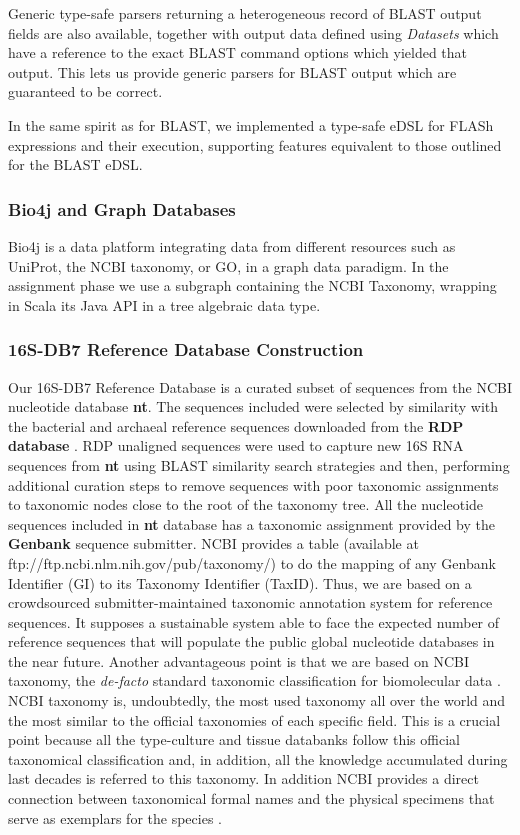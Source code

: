 \documentclass[fleqn,10pt,lineno]{wlpeerj}
\begin{document}
Generic type-safe parsers returning a heterogeneous record of BLAST
output fields are also available, together with output data defined
using \emph{Datasets} which have a reference to the exact BLAST command
options which yielded that output. This lets us provide generic parsers
for BLAST output which are guaranteed to be correct.

In the same spirit as for BLAST, we implemented a type-safe eDSL for
FLASh expressions and their execution, supporting features equivalent to
those outlined for the BLAST eDSL.

\subsubsection{Bio4j and Graph
Databases}\label{bio4j-and-graph-databases}

Bio4j \citep{pareja2015bio4j} is a data platform integrating data from
different resources such as UniProt, the NCBI taxonomy, or GO, in a
graph data paradigm. In the assignment phase we use a subgraph
containing the NCBI Taxonomy, wrapping in Scala its Java API in a tree
algebraic data type.

\subsubsection{16S-DB7 Reference Database
Construction}\label{s-db7-reference-database-construction}

Our 16S-DB7 Reference Database is a curated subset of sequences from the
NCBI nucleotide database \textbf{nt}. The sequences included were
selected by similarity with the bacterial and archaeal reference
sequences downloaded from the \textbf{RDP database}
\citep{cole2013ribosomal}. RDP unaligned sequences were used to capture
new 16S RNA sequences from \textbf{nt} using BLAST similarity search
strategies and then, performing additional curation steps to remove
sequences with poor taxonomic assignments to taxonomic nodes close to
the root of the taxonomy tree. All the nucleotide sequences included in
\textbf{nt} database has a taxonomic assignment provided by the
\textbf{Genbank} sequence submitter. NCBI provides a table (available at
ftp://ftp.ncbi.nlm.nih.gov/pub/taxonomy/) to do the mapping of any
Genbank Identifier (GI) to its Taxonomy Identifier (TaxID). Thus, we are
based on a crowdsourced submitter-maintained taxonomic annotation system
for reference sequences. It supposes a sustainable system able to face
the expected number of reference sequences that will populate the public
global nucleotide databases in the near future. Another advantageous
point is that we are based on NCBI taxonomy, the \emph{de-facto}
standard taxonomic classification for biomolecular data
\citep{cochrane20102010}. NCBI taxonomy is, undoubtedly, the most used
taxonomy all over the world and the most similar to the official
taxonomies of each specific field. This is a crucial point because all
the type-culture and tissue databanks follow this official taxonomical
classification and, in addition, all the knowledge accumulated during
last decades is referred to this taxonomy. In addition NCBI provides a
direct connection between taxonomical formal names and the physical
specimens that serve as exemplars for the species
\citep{federhen2014type}.
\end{document}
